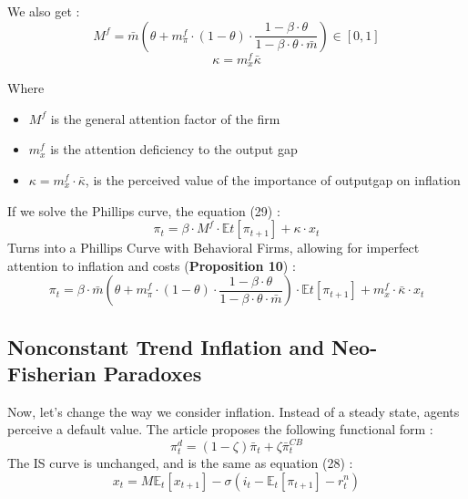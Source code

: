 \documentclass{beamer}
\begin{document}
\begin{frame}{\subsecname}
    We also get : 
    \begin{equation*}
        M^{f}=\bar{m}\left(\theta+m^{f}_{\pi}\cdot(1-\theta)\cdot\frac{1-\beta\cdot\theta}{1-\beta\cdot\theta\cdot\bar{m}}\right)\in\left[0,1\right]
    \end{equation*}
    \begin{equation}\tag{58}
        \kappa = m^{f}_{x}\bar{\kappa}
    \end{equation}

    Where 
    \begin{itemize}
        \item $M^{f}$ is the general attention factor of the firm
        \item $m^{f}_{x}$ is the attention deficiency to the output gap
        \item $\kappa=m_{x}^{f}\cdot\bar{\kappa}$, is the perceived value of the importance of outputgap on inflation
    \end{itemize}
\end{frame}

\begin{frame}{\subsecname}
    If we solve the Phillips curve, the equation (29) : 
    \begin{equation}\tag{29}
        \pi_{t}=\beta\cdot M^{f}\cdot\mathbb{E}t\left[\pi_{t+1}\right]+\kappa\cdot x_{t}
    \end{equation}
    Turns into a Phillips Curve with Behavioral Firms, allowing for imperfect attention to inflation and costs (\textbf{Proposition 10}) :
    \begin{equation*}
        \pi_{t}=\beta\cdot\bar{m}\left(\theta+m^{f}_{\pi}\cdot(1-\theta)\cdot\frac{1-\beta\cdot\theta}{1-\beta\cdot\theta\cdot\bar{m}}\right)\cdot\mathbb{E}t\left[\pi_{t+1}\right]+m_{x}^{f}\cdot\bar{\kappa}\cdot x_{t}
    \end{equation*}
\end{frame}

\subsection{Nonconstant Trend Inflation and Neo- Fisherian Paradoxes}
\begin{frame}{\subsecname}
    Now, let's change the way we consider inflation. Instead of a steady state, agents perceive a default value.
    The article proposes the following functional form :
    \begin{equation}\tag{59}
        \pi^{d}_{t}=(1-\zeta)\bar{\pi}_{t}+\zeta\bar{\pi}_{t}^{CB}
    \end{equation}
    The IS curve is unchanged, and is the same as equation (28) :
    \begin{equation}\tag{60}
        x_{t}=M\mathbb{E}_{t}\left[x_{t+1}\right]-\sigma\left(i_{t}-\mathbb{E}_{t}\left[\pi_{t+1}\right]-r^{n}_{t}\right)
    \end{equation}
\end{frame}
\end{document}
